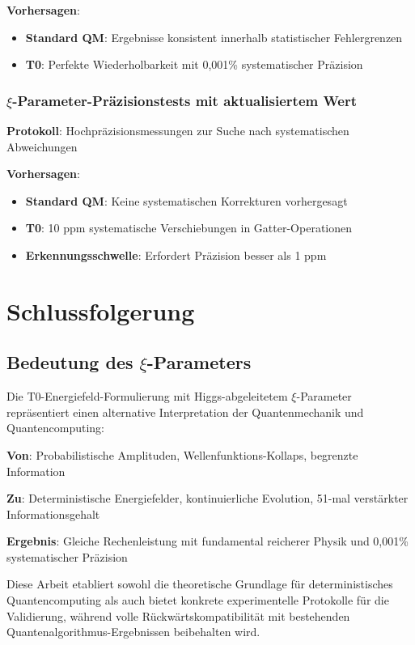 	\textbf{Vorhersagen}:
	\begin{itemize}
		\item \textbf{Standard QM}: Ergebnisse konsistent innerhalb statistischer Fehlergrenzen
		\item \textbf{T0}: Perfekte Wiederholbarkeit mit 0,001\% systematischer Präzision
	\end{itemize}
	
	\subsubsection{$\xi$-Parameter-Präzisionstests mit aktualisiertem Wert}
	
	\textbf{Protokoll}: Hochpräzisionsmessungen zur Suche nach systematischen Abweichungen
	
	\textbf{Vorhersagen}:
	\begin{itemize}
		\item \textbf{Standard QM}: Keine systematischen Korrekturen vorhergesagt
		\item \textbf{T0}: 10 ppm systematische Verschiebungen in Gatter-Operationen
		\item \textbf{Erkennungsschwelle}: Erfordert Präzision besser als 1 ppm
	\end{itemize}
	
	\section{Schlussfolgerung}
	
	\subsection{Bedeutung des $\xi$-Parameters}
	
	\begin{tcolorbox}[colback=red!5!white,colframe=red!75!black,title=Zusammenfassung der T0-Interpretation]
		Die T0-Energiefeld-Formulierung mit Higgs-abgeleitetem $\xi$-Parameter repräsentiert einen alternative Interpretation der Quantenmechanik und Quantencomputing:
		
		\textbf{Von}: Probabilistische Amplituden, Wellenfunktions-Kollaps, begrenzte Information
		
		\textbf{Zu}: Deterministische Energiefelder, kontinuierliche Evolution, 51-mal verstärkter Informationsgehalt
		
		\textbf{Ergebnis}: Gleiche Rechenleistung mit fundamental reicherer Physik und 0,001\% systematischer Präzision
		
		Diese Arbeit etabliert sowohl die theoretische Grundlage für deterministisches Quantencomputing als auch bietet konkrete experimentelle Protokolle für die Validierung, während volle Rückwärtskompatibilität mit bestehenden Quantenalgorithmus-Ergebnissen beibehalten wird.
	\end{tcolorbox}
	
